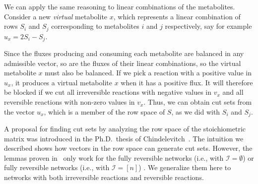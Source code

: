 \documentclass{bioinfo}
\theoremstyle{plain}
\theoremstyle{definition}
\begin{document}
We can apply the same reasoning to linear combinations of the metabolites.
Consider a new \emph{virtual} metabolite $x$, %
which represents a linear combination of rows $S_i$ and $S_j$ corresponding to metabolites $i$ and $j$ respectively, say for example $u_x = 2S_i - S_j$. %

Since the fluxes producing and consuming each metabolite are balanced in any admissible vector, so are the fluxes of their linear combinations, so the virtual metabolite $x$ must also be balanced. %
If we pick a reaction with a positive value in $u_x$, it produces a virtual metabolite $x$ when it has a positive flux. It will therefore be blocked if we cut all irreversible reactions with negative values in $v_x$ and all reversible reactions with non-zero values in $v_x$. Thus, we can obtain cut sets from the vector $u_x$, which is a member of the row space of $S$, as we did with $S_i$ and $S_j$.

A proposal for finding cut sets by analyzing the row space of the stoichiometric matrix was introduced in the Ph.D.~thesis of Chindelevitch~\cite{Thesis}. The intuition we described shows how vectors in the row space can generate cut sets. However, the lemmas proven in~\cite{Thesis} only work for the fully reversible networks (i.e., with $\mathcal{I} = \emptyset$) or fully reversible networks (i.e., with $\mathcal{I} = [n]$) . We generalize them here to networks with both irreversible reactions and reversible reactions.
\end{document}
